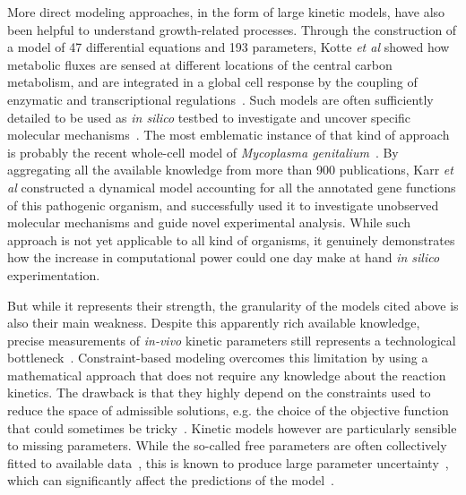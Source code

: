 More direct modeling approaches, in the form of large kinetic models, have also been helpful to understand growth-related processes.
Through the construction of a model of 47 differential equations and 193 parameters, Kotte \textit{et al} showed how metabolic fluxes are sensed at different locations of the central carbon metabolism, and are integrated in a global cell response by the coupling of enzymatic and transcriptional regulations~\cite{kotte_bacterial_2010}.
Such models are often sufficiently detailed to be used as \textit{in silico} testbed to investigate and uncover specific molecular mechanisms~\cite{peskov_kinetic_2012}.
The most emblematic instance of that kind of approach is probably the recent whole-cell model of \textit{Mycoplasma genitalium}~\cite{karr_whole-cell_2012}.
By aggregating all the available knowledge from more than 900 publications, Karr \textit{et al} constructed a dynamical model accounting for all the annotated gene functions of this pathogenic organism, and successfully used it to investigate unobserved molecular mechanisms and guide novel experimental analysis.
While such approach is not yet applicable to all kind of organisms, it genuinely demonstrates how the increase in computational power could one day make at hand \textit{in silico} experimentation.

But while it represents their strength, the granularity of the models cited above is also their main weakness.
Despite this apparently rich available knowledge, precise measurements of \textit{in-vivo} kinetic parameters still represents a technological bottleneck~\cite{park_metabolite_2016,bennett_absolute_2009,buscher_cross-platform_2009}.
Constraint-based modeling overcomes this limitation by using a mathematical approach that does not require any knowledge about the reaction kinetics.
The drawback is that they highly depend on the constraints used to reduce the space of admissible solutions, e.g. the choice of the objective function that could sometimes be tricky~\cite{kauffman_advances_2003}.
Kinetic models however are particularly sensible to missing parameters.
While the so-called free parameters are often collectively fitted to available data~\cite{jaqaman_linking_2006,mendes_non-linear_1998}, this is known to produce large parameter uncertainty~\cite{cho_experimental_2003,brodersen_characterization_1987,rodriguez-fernandez_hybrid_2006}, which can significantly affect the predictions of the model~\cite{gutenkunst_universally_2007,ingram_network_2006,mayo_plasticity_2006}.

